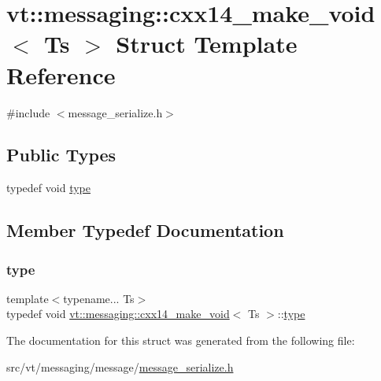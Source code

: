 \hypertarget{structvt_1_1messaging_1_1cxx14__make__void}{}\section{vt\+:\+:messaging\+:\+:cxx14\+\_\+make\+\_\+void$<$ Ts $>$ Struct Template Reference}
\label{structvt_1_1messaging_1_1cxx14__make__void}


{\ttfamily \#include $<$message\+\_\+serialize.\+h$>$}

\subsection*{Public Types}
\begin{DoxyCompactItemize}
\item 
typedef void \hyperlink{structvt_1_1messaging_1_1cxx14__make__void_a7322d20f987efd6028d1d56e579c2783}{type}
\end{DoxyCompactItemize}


\subsection{Member Typedef Documentation}
\mbox{\label{structvt_1_1messaging_1_1cxx14__make__void_a7322d20f987efd6028d1d56e579c2783}} 
\subsubsection{\texorpdfstring{type}{type}}
{\footnotesize\ttfamily template$<$typename... Ts$>$ \\
typedef void \hyperlink{structvt_1_1messaging_1_1cxx14__make__void}{vt\+::messaging\+::cxx14\+\_\+make\+\_\+void}$<$ Ts $>$\+::\hyperlink{structvt_1_1messaging_1_1cxx14__make__void_a7322d20f987efd6028d1d56e579c2783}{type}}



The documentation for this struct was generated from the following file\+:\begin{DoxyCompactItemize}
\item 
src/vt/messaging/message/\hyperlink{message__serialize_8h}{message\+\_\+serialize.\+h}\end{DoxyCompactItemize}
